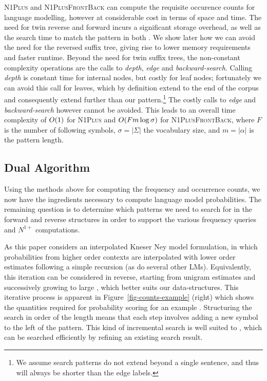 \textsc{N1Plus} and \textsc{N1PlusFrontBack} can compute the requisite occurence counts for \ngram language modelling, however at considerable cost in terms of space and time. 
The need for twin reverse and forward \CSTs incurs a significant storage overhead, as well as the search time to match the pattern in both \CSTs. 
We show later how we can avoid the need for the reversed suffix  tree, giving rise to lower memory requirements and faster runtime. 
Beyond the need for twin suffix trees, the non-constant complexity operations are the calls to \emph{depth}, \emph{edge} and \emph{backward-search}.
Calling \emph{depth} is constant time for internal nodes, but costly for leaf nodes; fortunately we can avoid this call for leaves, which by definition extend to the end of the corpus and consequently extend further than our pattern.\footnote{We assume search patterns do not extend beyond a single sentence, and thus will always be shorter than the edge labels.}
The costly calls to \emph{edge} and \emph{backward-search} however cannot be avoided.
This leads to an overall time complexity of $O(1)$ for \textsc{N1Plus} and $O(F m \log\sigma)$ for \textsc{N1PlusFrontBack}, where $F$ is the number of following symbols, $\sigma=|\Sigma|$ the vocabulary size, and $m=|\alpha|$ is the pattern length.

\subsection{Dual \CST Algorithm} 

Using the methods above for computing the frequency and occurrence
counts, we now have the ingredients necessary to compute \ngram language model
probabilities. The remaining question is to determine which patterns we need to search for
in the forward and reverse \CST structures in order to support the
various frequency queries and $N^{1+}$ computations.

As this paper considers an interpolated Kneser Ney model formulation, in which
probabilities from higher order contexts are interpolated with lower
order estimates following a simple recursion (as do several other LMs). 
Equivalently, this iteration can be considered in reverse, starting from unigram
estimates and successively growing to large \ngrams, which better
suits our \CST data-structures.
This iterative process is apparent in Figure~\ref{fig-counts-example} (right) which
shows the quantities required for probability scoring for an example \ngram.
Structuring the search in order of the \ngram length means that each step involves adding a new symbol to the left of the pattern.
This kind of incremental search is well suited to \CSTs, which can be searched efficiently by refining an existing search result.

